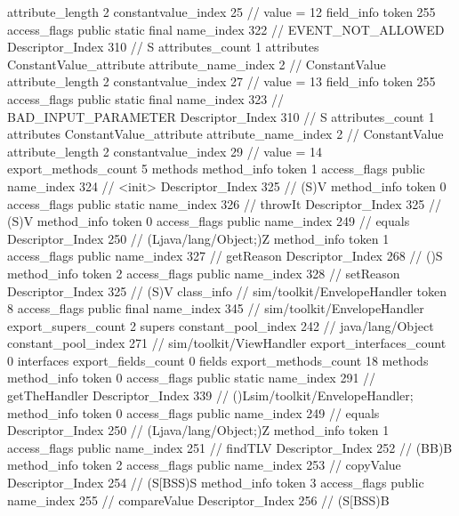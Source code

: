 {{{{{{{					attribute_length	2
					constantvalue_index	25		// value = 12
				}
				}
			}
			field_info {
				token	255
				access_flags	public static final
				name_index	322		// EVENT_NOT_ALLOWED
				Descriptor_Index	310		// S
				attributes_count	1
				attributes {
				ConstantValue_attribute {
					attribute_name_index	2		// ConstantValue
					attribute_length	2
					constantvalue_index	27		// value = 13
				}
				}
			}
			field_info {
				token	255
				access_flags	public static final
				name_index	323		// BAD_INPUT_PARAMETER
				Descriptor_Index	310		// S
				attributes_count	1
				attributes {
				ConstantValue_attribute {
					attribute_name_index	2		// ConstantValue
					attribute_length	2
					constantvalue_index	29		// value = 14
				}
				}
			}
			}
			export_methods_count	5
			methods {
				method_info {
					token	1
					access_flags	public
					name_index	324		// <init>
					Descriptor_Index	325		// (S)V
				}
				method_info {
					token	0
					access_flags	public static
					name_index	326		// throwIt
					Descriptor_Index	325		// (S)V
				}
				method_info {
					token	0
					access_flags	public
					name_index	249		// equals
					Descriptor_Index	250		// (Ljava/lang/Object;)Z
				}
				method_info {
					token	1
					access_flags	public
					name_index	327		// getReason
					Descriptor_Index	268		// ()S
				}
				method_info {
					token	2
					access_flags	public
					name_index	328		// setReason
					Descriptor_Index	325		// (S)V
				}
			}
		}
		class_info {		// sim/toolkit/EnvelopeHandler
			token	8
			access_flags	public final
			name_index	345		// sim/toolkit/EnvelopeHandler
			export_supers_count	2
			supers {
				constant_pool_index	242		// java/lang/Object
				constant_pool_index	271		// sim/toolkit/ViewHandler
			}
			export_interfaces_count	0
			interfaces {
			}
			export_fields_count	0
			fields {
			}
			export_methods_count	18
			methods {
				method_info {
					token	0
					access_flags	public static
					name_index	291		// getTheHandler
					Descriptor_Index	339		// ()Lsim/toolkit/EnvelopeHandler;
				}
				method_info {
					token	0
					access_flags	public
					name_index	249		// equals
					Descriptor_Index	250		// (Ljava/lang/Object;)Z
				}
				method_info {
					token	1
					access_flags	public
					name_index	251		// findTLV
					Descriptor_Index	252		// (BB)B
				}
				method_info {
					token	2
					access_flags	public
					name_index	253		// copyValue
					Descriptor_Index	254		// (S[BSS)S
				}
				method_info {
					token	3
					access_flags	public
					name_index	255		// compareValue
					Descriptor_Index	256		// (S[BSS)B
}}}}}
